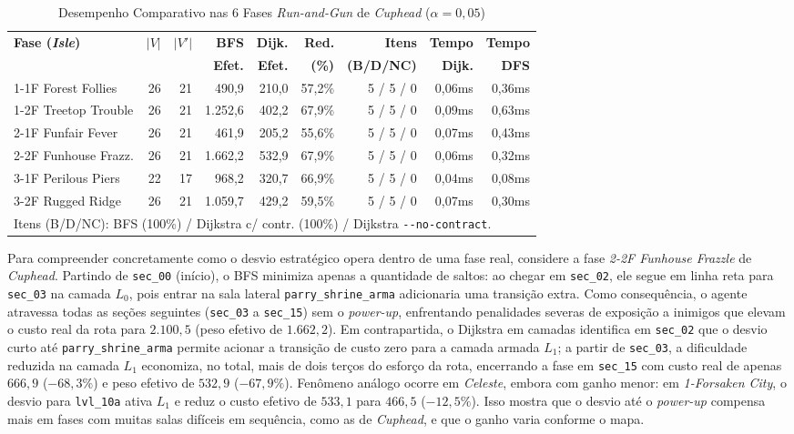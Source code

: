 \documentclass[conference]{IEEEtran}
\begin{document}
\begin{table}[!htbp]
\caption{Desempenho Comparativo nas 6 Fases \textit{Run-and-Gun} de \textit{Cuphead} ($\alpha = 0{,}05$)}
\label{tab:cuphead}
\centering
\scriptsize
\setlength{\tabcolsep}{2.8pt}
\begin{tabular}{lrrrrrrrr}
\toprule
\textbf{Fase (\textit{Isle})} & $|V|$ & $|V'|$ & \textbf{BFS} & \textbf{Dijk.} & \textbf{Red.} & \textbf{Itens} & \textbf{Tempo} & \textbf{Tempo} \\
 & & & \textbf{Efet.} & \textbf{Efet.} & \textbf{(\%)} & \textbf{(B/D/NC)} & \textbf{Dijk.} & \textbf{DFS} \\
\midrule
1-1F Forest Follies  & 26 & 21 &   490,9 & 210,0 & 57,2\% & 5 / 5 / 0 & 0,06ms & 0,36ms \\
1-2F Treetop Trouble & 26 & 21 & 1.252,6 & 402,2 & 67,9\% & 5 / 5 / 0 & 0,09ms & 0,63ms \\
2-1F Funfair Fever   & 26 & 21 &   461,9 & 205,2 & 55,6\% & 5 / 5 / 0 & 0,07ms & 0,43ms \\
2-2F Funhouse Frazz. & 26 & 21 & 1.662,2 & 532,9 & 67,9\% & 5 / 5 / 0 & 0,06ms & 0,32ms \\
3-1F Perilous Piers  & 22 & 17 &   968,2 & 320,7 & 66,9\% & 5 / 5 / 0 & 0,04ms & 0,08ms \\
3-2F Rugged Ridge    & 26 & 21 & 1.059,7 & 429,2 & 59,5\% & 5 / 5 / 0 & 0,07ms & 0,30ms \\
\bottomrule
\multicolumn{9}{l}{\tiny Itens (B/D/NC): BFS (100\%) / Dijkstra c/ contr. (100\%) / Dijkstra \texttt{-{}-no-contract}.}
\end{tabular}
\end{table}

Para compreender concretamente como o desvio estrat\'egico opera dentro de uma fase real, considere a fase \textit{2-2F Funhouse Frazzle} de \textit{Cuphead}. Partindo de \texttt{sec\_00} (in\'icio), o BFS minimiza apenas a quantidade de saltos: ao chegar em \texttt{sec\_02}, ele segue em linha reta para \texttt{sec\_03} na camada $L_0$, pois entrar na sala lateral \texttt{parry\_shrine\_arma} adicionaria uma transi\c{c}\~ao extra. Como consequ\^encia, o agente atravessa todas as se\c{c}\~oes seguintes (\texttt{sec\_03} a \texttt{sec\_15}) sem o \textit{power-up}, enfrentando penalidades severas de exposi\c{c}\~ao a inimigos que elevam o custo real da rota para $2.100{,}5$ (peso efetivo de $1.662{,}2$). Em contrapartida, o Dijkstra em camadas identifica em \texttt{sec\_02} que o desvio curto at\'e \texttt{parry\_shrine\_arma} permite acionar a transi\c{c}\~ao de custo zero para a camada armada $L_1$; a partir de \texttt{sec\_03}, a dificuldade reduzida na camada $L_1$ economiza, no total, mais de dois ter\c{c}os do esfor\c{c}o da rota, encerrando a fase em \texttt{sec\_15} com custo real de apenas $666{,}9$ ($-68{,}3\%$) e peso efetivo de $532{,}9$ ($-67{,}9\%$). Fen\^omeno an\'alogo ocorre em \textit{Celeste}, embora com ganho menor: em \textit{1-Forsaken City}, o desvio para \texttt{lvl\_10a} ativa $L_1$ e reduz o custo efetivo de $533{,}1$ para $466{,}5$ ($-12{,}5\%$). Isso mostra que o desvio at\'e o \textit{power-up} compensa mais em fases com muitas salas dif\'iceis em sequ\^encia, como as de \textit{Cuphead}, e que o ganho varia conforme o mapa.
\end{document}
